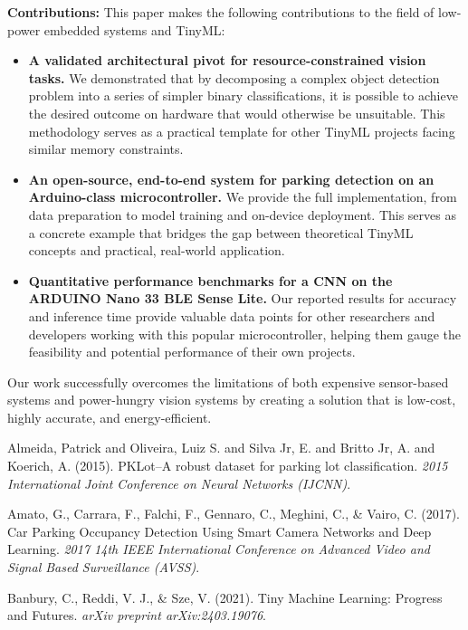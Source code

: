 \documentclass[sigconf,10pt,nonacm]{acmart}
\begin{document}
\noindent\textbf{Contributions:}
This paper makes the following contributions to the field of low-power embedded systems and TinyML:
\begin{itemize}
    \item \textbf{A validated architectural pivot for resource-constrained vision tasks.} We demonstrated that by decomposing a complex object detection problem into a series of simpler binary classifications, it is possible to achieve the desired outcome on hardware that would otherwise be unsuitable. This methodology serves as a practical template for other TinyML projects facing similar memory constraints.
    
    \item \textbf{An open-source, end-to-end system for parking detection on an Arduino-class microcontroller.} We provide the full implementation, from data preparation to model training and on-device deployment. This serves as a concrete example that bridges the gap between theoretical TinyML concepts and practical, real-world application.
    
    \item \textbf{Quantitative performance benchmarks for a CNN on the ARDUINO Nano 33 BLE Sense Lite.} Our reported results for accuracy and inference time provide valuable data points for other researchers and developers working with this popular microcontroller, helping them gauge the feasibility and potential performance of their own projects.
\end{itemize}

Our work successfully overcomes the limitations of both expensive sensor-based systems and power-hungry vision systems by creating a solution that is low-cost, highly accurate, and energy-efficient.

\begin{thebibliography}{9}

Almeida, Patrick and Oliveira, Luiz S. and Silva Jr, E. and Britto Jr, A. and Koerich, A. (2015).
PKLot--A robust dataset for parking lot classification.
\textit{2015 International Joint Conference on Neural Networks (IJCNN)}.

Amato, G., Carrara, F., Falchi, F., Gennaro, C., Meghini, C., \& Vairo, C. (2017).
Car Parking Occupancy Detection Using Smart Camera Networks and Deep Learning.
\textit{2017 14th IEEE International Conference on Advanced Video and Signal Based Surveillance (AVSS)}.

Banbury, C., Reddi, V. J., \& Sze, V. (2021).
Tiny Machine Learning: Progress and Futures.
\textit{arXiv preprint arXiv:2403.19076}.

\end{thebibliography}
\end{document}
